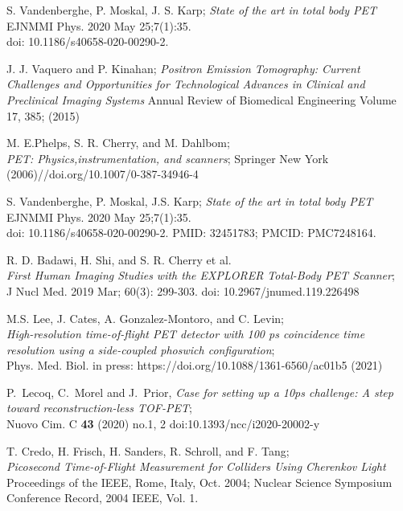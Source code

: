 \documentclass[12pt]{article}
\begin{document}
 \begin{thebibliography}{99}
S. Vandenberghe, P. Moskal, J. S. Karp;
{\it  State of the art in total body PET}\\
 EJNMMI Phys. 2020 May 25;7(1):35.\\
doi: 10.1186/s40658-020-00290-2.

 J. J. Vaquero and P. Kinahan; {\it Positron
  Emission Tomography: Current Challenges and Opportunities for
  Technological Advances in Clinical and Preclinical Imaging Systems}
  Annual Review of Biomedical Engineering Volume 17, 385; (2015)

 M. E.Phelps, S. R. Cherry, and M.
Dahlbom;\\
{\it PET: Physics,instrumentation, and scanners}; Springer New York
(2006)//doi.org/10.1007/0-387-34946-4

S. Vandenberghe, P. Moskal, J.S. Karp;
{\it  State of the art in total body PET}\\
 EJNMMI Phys. 2020 May 25;7(1):35.\\
doi: 10.1186/s40658-020-00290-2. PMID: 32451783; PMCID: PMC7248164.

R. D. Badawi, H. Shi, and S. R. Cherry et al.\\
{\it First Human Imaging Studies with the EXPLORER Total-Body PET Scanner};\\
J Nucl Med. 2019 Mar; 60(3): 299-303. doi: 10.2967/jnumed.119.226498

    M.S. Lee, J. Cates, A. Gonzalez-Montoro, and C. Levin;\\
  {\it High-resolution time-of-flight PET detector with 100 ps coincidence time resolution
  using a side-coupled phoswich configuration};\\
  Phys. Med. Biol. in press: https://doi.org/10.1088/1361-6560/ac01b5 (2021)

 P.~Lecoq, C.~Morel and J.~Prior,
{\it Case for setting up a 10ps challenge: A step toward reconstruction-less TOF-PET};\\
Nuovo Cim. C \textbf{43} (2020) no.1, 2 doi:10.1393/ncc/i2020-20002-y

 T. Credo, H. Frisch, H.
Sanders, R. Schroll, and F. Tang;\\
 {\it Picosecond Time-of-Flight Measurement for Colliders Using
  Cherenkov Light}\\
Proceedings of the IEEE, Rome, Italy, Oct. 2004; Nuclear Science
Symposium Conference Record, 2004 IEEE, Vol. 1.


\end{thebibliography}
\end{document}
